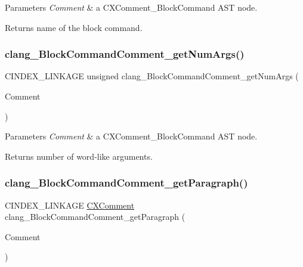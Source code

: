 \begin{DoxyParams}{Parameters}
{\em Comment} & a {\ttfamily C\+X\+Comment\+\_\+\+Block\+Command} A\+ST node.\\
\hline
\end{DoxyParams}
\begin{DoxyReturn}{Returns}
name of the block command. 
\end{DoxyReturn}
\mbox{\label{group__CINDEX__COMMENT_gacb447968ce9efdfdabbfca8918540cdf}} 
\subsubsection{\texorpdfstring{clang\+\_\+\+Block\+Command\+Comment\+\_\+get\+Num\+Args()}{clang\_BlockCommandComment\_getNumArgs()}}
{\footnotesize\ttfamily C\+I\+N\+D\+E\+X\+\_\+\+L\+I\+N\+K\+A\+GE unsigned clang\+\_\+\+Block\+Command\+Comment\+\_\+get\+Num\+Args (\begin{DoxyParamCaption}\item[{\hyperlink{structCXComment}{C\+X\+Comment}}]{Comment }\end{DoxyParamCaption})}


\begin{DoxyParams}{Parameters}
{\em Comment} & a {\ttfamily C\+X\+Comment\+\_\+\+Block\+Command} A\+ST node.\\
\hline
\end{DoxyParams}
\begin{DoxyReturn}{Returns}
number of word-\/like arguments. 
\end{DoxyReturn}
\mbox{\label{group__CINDEX__COMMENT_gac6f2ffc8fdbe9394bd4bb7d54327c968}} 
\subsubsection{\texorpdfstring{clang\+\_\+\+Block\+Command\+Comment\+\_\+get\+Paragraph()}{clang\_BlockCommandComment\_getParagraph()}}
{\footnotesize\ttfamily C\+I\+N\+D\+E\+X\+\_\+\+L\+I\+N\+K\+A\+GE \hyperlink{structCXComment}{C\+X\+Comment} clang\+\_\+\+Block\+Command\+Comment\+\_\+get\+Paragraph (\begin{DoxyParamCaption}\item[{\hyperlink{structCXComment}{C\+X\+Comment}}]{Comment }\end{DoxyParamCaption})}


